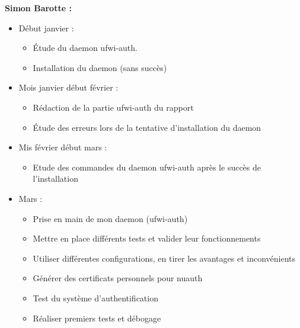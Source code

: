 \documentclass[12pt]{report}
\begin{document}
\begin{itemize}
\textbf{Simon Barotte :}
\begin{itemize}
  \item Début janvier :
  \begin{itemize}
    \item Étude du daemon ufwi-auth.
    \item Installation du daemon (sans succès)
  \end{itemize}
  \item Mois janvier début février :
  \begin{itemize}
    \item Rédaction de la partie ufwi-auth du rapport
    \item Étude des erreurs lors de la tentative d'installation du daemon
  \end{itemize}
  \item Mis février début mars :
  \begin{itemize}
    \item Etude des commandes du daemon ufwi-auth après le succès de l'installation
  \end{itemize}
  \item Mars :
  \begin{itemize}
    \item Prise en main de mon daemon (ufwi-auth)
	  \item Mettre en place différents tests et valider leur fonctionnements
	  \item Utiliser différentes configurations, en tirer les avantages et inconvénients
	  \item Générer des certificats personnels pour nuauth	
	  \item Test du système d'authentification
	  \item Réaliser premiers tests et débogage
  \end{itemize}
\end{itemize}
	

\end{itemize}
\end{document}
